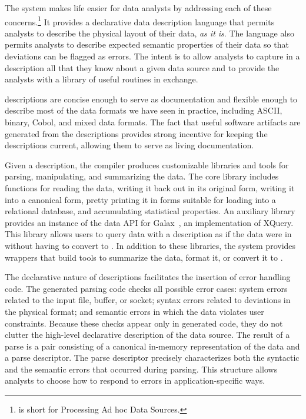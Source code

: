 \documentclass{sig-alternate}
\begin{document}
The \pads{} system makes life easier for data analysts by addressing
each of these concerns.\footnote{
  \pads{} is short for Processing Ad hoc Data Sources.
}
It provides a declarative data description
language that permits analysts to describe the physical layout of
their data, \textit{as it is}.  The language also permits analysts to
describe expected semantic properties of their data so that deviations can
be flagged as errors. The intent is to allow analysts to capture in a
\pads{} description all that they know about a given data source
and to provide the analysts with a library of useful routines in exchange. 


\pads{} descriptions are concise enough to
serve as documentation and flexible enough to describe most of
the data formats we have seen in practice, including ASCII, binary,
Cobol, and mixed data formats.  The fact that useful software
artifacts are generated from the descriptions provides strong
incentive for keeping the descriptions current, allowing them to serve
as living documentation.  

Given a \pads{} description, the \pads{} compiler produces customizable \C{} libraries
and tools for parsing, manipulating, and summarizing the data. 
The core \C{} library includes functions for reading the data, writing it 
back out in its original form, writing it into a canonical \xml{} form, pretty printing
it in forms suitable for loading into a relational database, and accumulating  
statistical properties.  An auxiliary library provides 
an instance of the data API for Galax~\cite{galax,galaxmanual}, an implementation of XQuery.  This 
library allows users to query data with a \pads{} description as if the data were
in \xml{} without having to convert to \xml{}.  In addition to these libraries,
the \pads{} system provides wrappers that build tools to 
summarize the data, format it,  or convert it to \xml{}.

The declarative nature of \pads{} descriptions facilitates the
insertion of error handling code.
The generated parsing code checks all possible error cases: system
errors related to the input file, buffer, or socket; syntax errors
related to deviations in the physical format; and semantic errors in
which the data violates user constraints.  Because these checks appear
only in generated code, they do not clutter the high-level declarative
description of the data source.
The result of a parse is a pair consisting of a canonical in-memory
representation of the data and a parse descriptor. The parse
descriptor precisely characterizes both the syntactic and the semantic
errors that occurred during parsing.  This structure allows analysts
to choose how to respond to errors in application-specific ways.  
\end{document}
